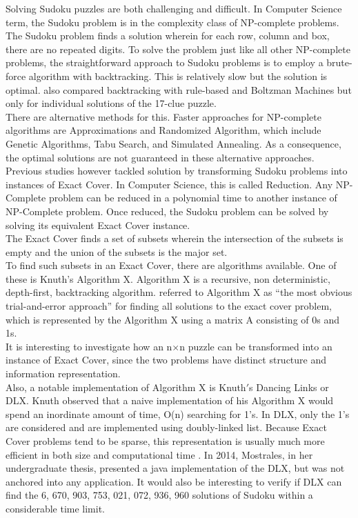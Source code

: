 \documentclass[a4paper,oneside,11pt]{report}
\newcounter{row}
\newcounter{col}
\begin{document}
Solving Sudoku puzzles are both challenging and difficult. In Computer Science term, the Sudoku problem is in the complexity class of NP-complete problems. The Sudoku problem finds a solution wherein for each row, column and box, there are no repeated digits. To solve the problem just like all other NP-complete problems, the straightforward approach to Sudoku problems is to employ a brute-force algorithm with backtracking. This is relatively slow but the solution is optimal. \cite{Berggren} also compared backtracking with rule-based and Boltzman Machines but only for individual solutions of the 17-clue puzzle.\\

There are alternative methods for this. Faster approaches for NP-complete algorithms are Approximations and Randomized Algorithm, which include Genetic Algorithms, Tabu Search, and Simulated Annealing. As a consequence, the optimal solutions are not guaranteed in these alternative approaches.\\

Previous studies however tackled solution by transforming Sudoku problems into instances of Exact Cover. In Computer Science, this is called Reduction. Any NP-Complete problem can be reduced in a polynomial time to another instance of NP-Complete problem. Once reduced, the Sudoku problem can be solved by solving its equivalent Exact Cover instance.\\

The Exact Cover finds a set of subsets wherein the intersection of the subsets is empty and the union of the subsets is the major set.\\

To find such subsets in an Exact Cover, there are algorithms available. One of these is Knuth’s Algorithm X. Algorithm X is a recursive, non deterministic, depth-first, backtracking algorithm. \cite{Knuth} referred to Algorithm X as “the most obvious trial-and-error approach” for finding all solutions to the exact cover problem, which is represented by the Algorithm X using  a matrix A consisting of 0s and 1s.\\

It is interesting to investigate how an n$\times$n puzzle can be transformed into an instance of Exact Cover, since the two problems have distinct structure and information representation.\\

Also, a notable implementation of Algorithm X is Knuth$'$s Dancing Links or DLX. Knuth observed that a naive implementation of his Algorithm X would spend an inordinate amount of time, O(n) searching for 1’s. In DLX, only the 1’s are considered and are implemented using doubly-linked list. Because Exact Cover problems tend to be sparse, this representation is usually much more efficient in both size and computational time \cite{Dahlke}. In 2014, Mostrales, in her undergraduate thesis, presented a java implementation of the DLX, but was not anchored into any application. It would also be interesting to verify if DLX can find the 6, 670, 903, 753, 021, 072, 936, 960 solutions of Sudoku within a considerable time limit.\\
\end{document}
